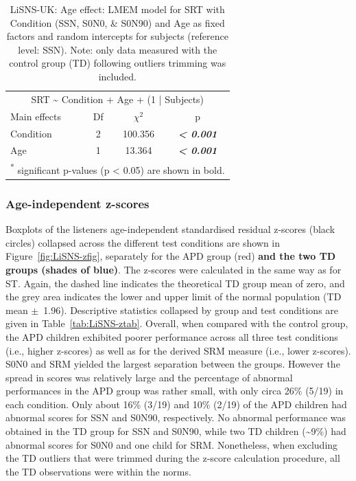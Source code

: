 \documentclass[a4paper, twoside]{templates/ociamthesis}
\begin{document}
\begin{table}

\caption{\label{tab:LiSNS-AgeLMEMTab}LiSNS-UK: Age effect: LMEM model for SRT with Condition (SSN, S0N0, \& S0N90) and Age as fixed factors and random intercepts for subjects (reference level: SSN). Note: only data measured with the control group (TD) following outliers trimming was included.}
\centering
\begin{tabular}[t]{lcc>{}c}
\toprule
\multicolumn{4}{c}{SRT \textasciitilde{} Condition + Age + (1 | Subjects)} \\
\cmidrule(l{3pt}r{3pt}){1-4}
Main effects & Df & $\chi^{2}$ & p\\
\midrule
Condition & 2 & 100.356 & \em{\textbf{< 0.001}}\\
Age & 1 & 13.364 & \em{\textbf{< 0.001}}\\
\bottomrule
\multicolumn{4}{l}{\textsuperscript{*} significant p-values (p < 0.05) are shown in bold.}\\
\end{tabular}
\end{table}

\hypertarget{age-independent-z-scores-1}{%
\subsubsection*{Age-independent z-scores}\label{age-independent-z-scores-1}}

Boxplots of the listeners age-independent standardised residual z-scores (black circles) collapsed across the different test conditions are shown in Figure~\ref{fig:LiSNS-zfig}, separately for the APD group (red) \textbf{and the two TD groups (shades of blue)}. The z-scores were calculated in the same way as for ST. Again, the dashed line indicates the theoretical TD group mean of zero, and the grey area indicates the lower and upper limit of the normal population (TD mean \(\pm\)~1.96). Descriptive statistics collapsed by group and test conditions are given in Table~\ref{tab:LiSNS-ztab}. Overall, when compared with the control group, the APD children exhibited poorer performance across all three test conditions (i.e., higher z-scores) as well as for the derived SRM measure (i.e., lower z-scores).\\

S0N0 and SRM yielded the largest separation between the groups. However the spread in scores was relatively large and the percentage of abnormal performances in the APD group was rather small, with only circa 26\% (5/19) in each condition. Only about 16\% (3/19) and 10\% (2/19) of the APD children had abnormal scores for SSN and S0N90, respectively. No abnormal performance was obtained in the TD group for SSN and S0N90, while two TD children (\textasciitilde9\%) had abnormal scores for S0N0 and one child for SRM. Nonetheless, when excluding the TD outliers that were trimmed during the z-score calculation procedure, all the TD observations were within the norms.\\
\end{document}

